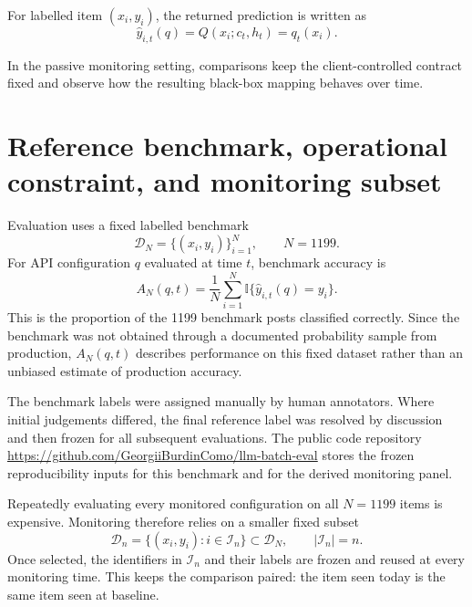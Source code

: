 For labelled item \((x_i,y_i)\), the returned prediction is written as
\begin{equation}
    \hat y_{i,t}(q)=Q(x_i;c_t,h_t)=q_t(x_i).
    \label{eq:item-prediction}
\end{equation}

In the passive monitoring setting, comparisons keep the client-controlled contract fixed and observe how the resulting black-box mapping behaves over time.

\section{Reference benchmark, operational constraint, and monitoring subset}
\label{sec:input-datasets}

Evaluation uses a fixed labelled benchmark
\begin{equation}
    \mathcal{D}_N
    =
    \{(x_i,y_i)\}_{i=1}^{N},
    \qquad
    N=1199.
    \label{eq:full-benchmark}
\end{equation}
For API configuration \(q\) evaluated at time \(t\), benchmark accuracy is
\begin{equation}
    A_N(q,t)
    =
    \frac{1}{N}
    \sum_{i=1}^{N}
    \mathbb{I}\{\hat y_{i,t}(q)=y_i\}.
    \label{eq:finite-benchmark-accuracy}
\end{equation}
This is the proportion of the 1199 benchmark posts classified correctly. Since the benchmark was not obtained through a documented probability sample from production, \(A_N(q,t)\) describes performance on this fixed dataset rather than an unbiased estimate of production accuracy.

The benchmark labels were assigned manually by human annotators. Where initial judgements differed, the final reference label was resolved by discussion and then frozen for all subsequent evaluations.
The public code repository \url{https://github.com/GeorgiiBurdinComo/llm-batch-eval} stores the frozen reproducibility inputs for this benchmark and for the derived monitoring panel.

Repeatedly evaluating every monitored configuration on all \(N=1199\) items is expensive. Monitoring therefore relies on a smaller fixed subset
\begin{equation}
    \mathcal{D}_n
    =
    \{(x_i,y_i):i\in\mathcal{I}_n\}
    \subset\mathcal{D}_N,
    \qquad
    |\mathcal{I}_n|=n.
    \label{eq:sentinel-panel}
\end{equation}
Once selected, the identifiers in \(\mathcal{I}_n\) and their labels are frozen and reused at every monitoring time. This keeps the comparison paired: the item seen today is the same item seen at baseline.

